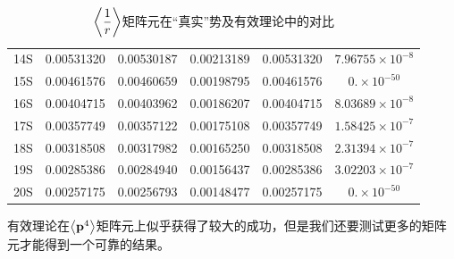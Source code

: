 \documentclass[cs4size,titlepage,twoside]{ctexart}
\begin{document}
\begin{table}[!hbp]
\begin{tabular}{|cccccc|}
		14S                   & 0.00531320                                 & 0.00530187                                       & 0.00213189                                       & 0.00531320                                                                          & $7.96755\times10^{-8}$   \\
		15S                   & 0.00461576                                 & 0.00460659                                       & 0.00198795                                       & 0.00461576                                                                          & $0.\times10^{-50}$       \\
		16S                   & 0.00404715                                 & 0.00403962                                       & 0.00186207                                       & 0.00404715                                                                          & $8.03689\times10^{-8}$   \\
		17S                   & 0.00357749                                 & 0.00357122                                       & 0.00175108                                       & 0.00357749                                                                          & $1.58425\times10^{-7}$   \\
		18S                   & 0.00318508                                 & 0.00317982                                       & 0.00165250                                       & 0.00318508                                                                          & $2.31394\times10^{-7}$   \\
		19S                   & 0.00285386                                 & 0.00284940                                       & 0.00156437                                       & 0.00285386                                                                          & $3.02203\times10^{-7}$   \\
		20S                   & 0.00257175                                 & 0.00256793                                       & 0.00148477                                       & 0.00257175                                                                          & $0.\times10^{-50}$       \\
		\hline
	\end{tabular}
	\caption{$\displaystyle\expval{\frac{1}{r}}$矩阵元在“真实”势及有效理论中的对比}\label{evr1}
\end{table}
有效理论在$\expval{\vb{p}^4}$矩阵元上似乎获得了较大的成功，但是我们还要测试更多的矩阵元才能得到一个可靠的结果。
\end{document}
